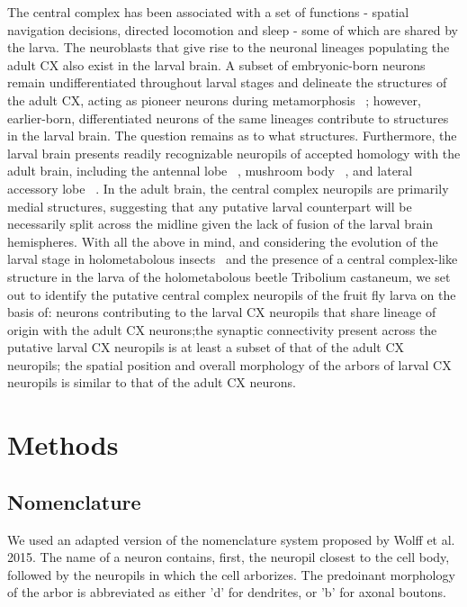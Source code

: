 \documentclass{article}
\begin{document}
The central complex has been associated with a set of functions - spatial navigation decisions, directed locomotion and sleep - some of which are shared by the larva. The neuroblasts that give rise to the neuronal lineages populating the adult CX also exist in the larval brain. A subset of embryonic-born neurons remain undifferentiated throughout larval stages and delineate the structures of the adult CX, acting as pioneer neurons during metamorphosis 
~\citep{andrade2019developmentally}; however, earlier-born, differentiated neurons of the same lineages contribute to structures in the larval brain. The question remains as to what structures. Furthermore, the larval brain presents readily recognizable neuropils of accepted homology with the adult brain, including the antennal lobe ~\citep{berck2016wiring}, mushroom body ~\citep{eichler2017complete}, and lateral accessory lobe ~\citep{hartenstein2015lineage}.
 In the adult brain, the central complex neuropils are primarily medial structures, suggesting that any putative larval counterpart will be necessarily split across the midline given the lack of fusion of the larval brain hemispheres. With all the above in mind, and considering the evolution of the larval stage in holometabolous insects ~\citep{truman1999origins}and the presence of a central complex-like structure in the larva of the holometabolous beetle Tribolium castaneum, we set out to identify the putative central complex neuropils of the fruit fly larva on the basis of: neurons contributing to the larval CX neuropils that share lineage of origin with the adult CX neurons;the synaptic connectivity present across the putative larval CX neuropils is at least a subset of that of the adult CX neuropils; the spatial position and overall morphology of the arbors of larval CX neuropils is similar to that of the adult CX neurons. 


\section{Methods}
 \subsection{Nomenclature}
 We used an adapted version of the nomenclature system proposed by Wolff et al. 2015.   
 The name of a neuron contains, first, the neuropil closest to the cell body, followed by the neuropils in which the cell arborizes. The predoinant morphology of the arbor is abbreviated as either 'd' for dendrites, or 'b' for axonal boutons. 
 
\end{document}
